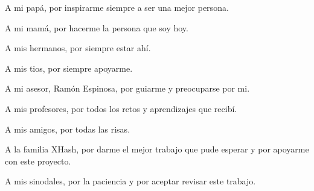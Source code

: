 \documentclass[11pt]{book}
\begin{document}
A mi papá, por inspirarme siempre a ser una mejor persona.

A mi mamá, por hacerme la persona que soy hoy.

A mis hermanos, por siempre estar ahí.

A mis tios, por siempre apoyarme. 

A mi asesor, Ramón Espinosa, por guiarme y preocuparse por mi. 

A mis profesores, por todos los retos y aprendizajes que recibí.

A mis amigos, por todas las risas. 


A la familia XHash, por darme el mejor trabajo que pude esperar y por apoyarme con este proyecto. 

A mis sinodales, por la paciencia y por aceptar revisar este trabajo.  
\end{document}
